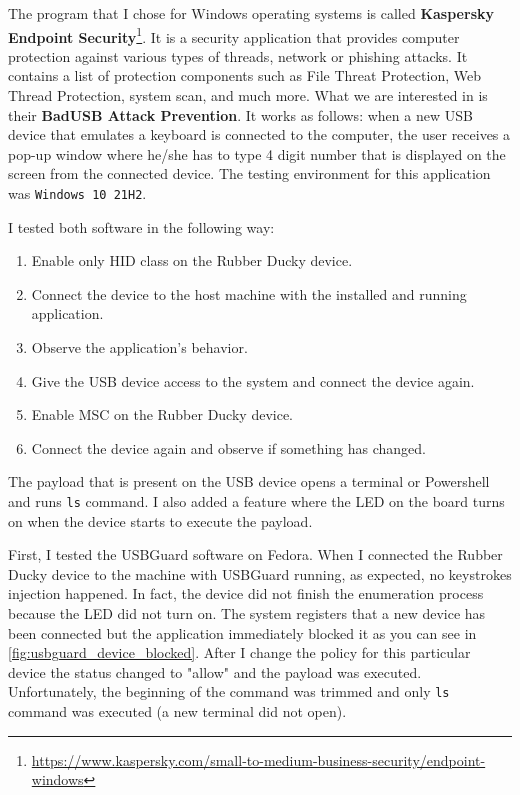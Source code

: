 The program that I chose for Windows operating systems is called \textbf{Kaspersky Endpoint Security}\footnote{\url{https://www.kaspersky.com/small-to-medium-business-security/endpoint-windows}}. It is a security application that provides computer protection against various types of threads, network or phishing attacks. It contains a list of protection components such as File Threat Protection, Web Thread Protection, system scan, and much more. What we are interested in is their \textbf{BadUSB Attack Prevention}. It works as follows: when a new USB device that emulates a keyboard is connected to the computer, the user receives a pop-up window where he/she has to type 4 digit number that is displayed on the screen from the connected device. The testing environment for this application was \verb|Windows 10 21H2|.

I tested both software in the following way:
\begin{enumerate}
    \item Enable only HID class on the Rubber Ducky device.
    \item Connect the device to the host machine with the installed and running application.
    \item Observe the application's behavior.
    \item Give the USB device access to the system and connect the device again.
    \item Enable MSC on the Rubber Ducky device.
    \item Connect the device again and observe if something has changed.
\end{enumerate}
The payload that is present on the USB device opens a terminal or Powershell and runs \verb|ls| command. I also added a feature where the LED on the board turns on when the device starts to execute the payload.

First, I tested the USBGuard software on Fedora. When I connected the Rubber Ducky device to the machine with USBGuard running, as expected, no keystrokes injection happened. In fact, the device did not finish the enumeration process because the LED did not turn on. The system registers that a new device has been connected but the application immediately blocked it as you can see in \autoref{fig:usbguard_device_blocked}. After I change the policy for this particular device the status changed to "allow" and the payload was executed. Unfortunately, the beginning of the command was trimmed and only \verb|ls| command was executed (a new terminal did not open).

